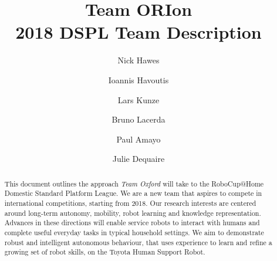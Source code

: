 \documentclass[runningheads,a4paper]{llncs}
\newcommand{\teamori}{Team Oxford}
\begin{document}
\title{Team ORIon\\ 2018 DSPL Team Description}

\author{Nick Hawes \and Ioannis Havoutis \and Lars Kunze \and Bruno Lacerda \and Paul Amayo \and Julie Dequaire }
\maketitle



\begin{abstract}
This document outlines the approach \textit{\teamori{}} will take to the 
RoboCup@Home Domestic Standard Platform League. 
We are a new team that aspires to compete in international competitions,
starting from 2018. Our research interests are centered around long-term
autonomy, mobility, robot learning and knowledge representation. 
Advances in these directions will enable service robots to interact with humans
and complete useful everyday tasks in typical household settings. 
We aim to demonstrate robust and intelligent autonomous behaviour, that uses
experience to learn and refine a growing set of robot skills, on the Toyota
Human Support Robot.
\end{abstract}



\end{document}

